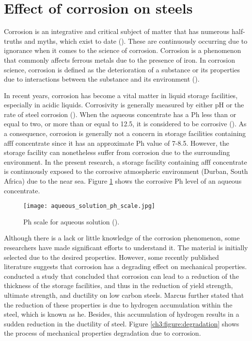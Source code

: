 \section{Effect of corrosion on steels}
\label{ch3:anchor:section:effects}
Corrosion is an integrative and critical subject of matter that has numerous half-truths and myths, which exist to date (\cite{mcarthur2004engineering}). These are continuously occurring due to ignorance when it comes to the science of corrosion.  Corrosion is a phenomenon that commonly affects ferrous metals due to the presence of iron. In corrosion science, corrosion is defined as the deterioration of a substance or its properties due to interactions between the substance and its environment (\cite{chigondo2016recent}).

In recent years, corrosion has become a vital matter in liquid storage facilities, especially in acidic liquids. Corrosivity is generally measured by either pH or the rate of steel corrosion (\cite{marzorati2018green}). When the aqueous concentrate has a Ph less than or equal to two, or more than or equal to 12.5, it is considered to be corrosive (\cite{marzorati2018green}). As a consequence, corrosion is generally not a concern in storage facilities containing \acrshort{afff} concentrate since it has an approximate Ph value of 7-8.5. However, the storage facility can nonetheless suffer from corrosion due to the surrounding environment. In the present research, a storage facility containing \acrshort{afff} concentrate is continuously exposed to the corrosive atmospheric environment (Durban, South Africa) due to the near sea. Figure \ref{ch3:figure:ph} shows the corrosive Ph level of an aqueous concentrate.
 
\begin{figure}[H]
    \centering
    \texttt{[image: aqueous\_solution\_ph\_scale.jpg]}
    \caption{Ph scale for aqueous solution (\cite{marzorati2018green}).}
    \label{ch3:figure:ph}
\end{figure}

Although there is a lack or little knowledge of the corrosion phenomenon, some researchers have made significant efforts to understand it. The material is initially selected due to the desired properties. However, some recently published literature suggests that corrosion has a degrading effect on mechanical properties. \cite{li2018effect} conducted a study that concluded that corrosion can lead to a reduction of the thickness of the storage facilities, and thus in the reduction of yield strength, ultimate strength, and ductility on low carbon steels.  Marcus \cite{protopopoff2011surface} further stated that the reduction of these properties is due to hydrogen accumulation within the steel, which is known as \acrfull{he}. Besides, this accumulation of hydrogen results in a sudden reduction in the ductility of steel. Figure \ref{ch3:figure:degradation} shows the process of mechanical properties degradation due to corrosion.

